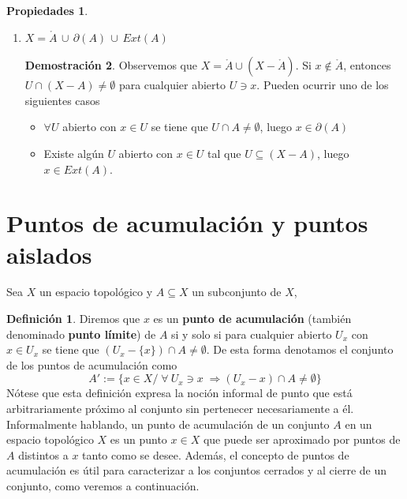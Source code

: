 \documentclass[12pt,twoside]{report}
\theoremstyle{azul}
\theoremstyle{azul2}
\theoremstyle{plain}
\theoremstyle{definition}
\newtheorem*{defi}{Definición}
\newtheorem*{propi}{Propiedades}
\newtheorem*{dem}{Demostración}
\theoremstyle{remark}
\begin{document}
\begin{propi}
\begin{enumerate}
\begin{dem}
    (Obsérvese que son si y solo sies, luego queda demostrado en ambos sentidos)
    \end{dem}
    \item $X = \mathring{A} \, \cup \, \partial(A) \, \cup \, Ext(A)$
    \begin{dem}
        Observemos que $X=\mathring{A}\cup(X-\mathring{A})$. Si $x\nin \mathring{A}$, entonces $U\cap (X-A)\neq\emptyset$ para cualquier abierto $U\ni x$. Pueden ocurrir uno de los siguientes casos  
        \begin{itemize}
        \item[1)] $\forall U$ abierto con $x\in U$ se tiene que $U\cap A\neq \emptyset$, luego $x\in \partial(A)$
        \item[2)] Existe algún $U$ abierto con $x\in U$ tal que $U\subseteq (X-A)$, luego $x\in Ext(A)$. 
\end{itemize}
\end{dem}
\end{enumerate}
\end{propi}

\section{Puntos de acumulación y puntos aislados} \label{ais}
Sea $X$ un espacio topológico y $A \subseteq X$ un subconjunto de $X$, 
\begin{defi}
Diremos que $x$  es un \textbf{punto de acumulación} (tambi{\'e}n denominado \textbf{punto límite}) de $A$ si y solo si para cualquier abierto $U_x$ con $x \in U_x$ se tiene que $(U_x- \{ x \}) \cap A \neq \emptyset$. De esta forma denotamos el conjunto de los puntos de acumulación como 
$$A':= \{x \in X / \; \forall \: U_x \ni x \; \Rightarrow (U_x - x) \cap A \neq \emptyset \}$$
\justifying Nótese que esta definición expresa la noción informal de punto que está arbitrariamente próximo al conjunto sin pertenecer necesariamente a él. Informalmente hablando, un punto de acumulación de un conjunto $A$ en un espacio topológico $X$ es un punto $x \in X$ que puede ser aproximado por puntos de $A$ distintos a $x$ tanto como se desee. Además, el concepto de puntos de acumulación es útil para caracterizar a los conjuntos cerrados y al cierre de un conjunto, como veremos a continuación.
\end{defi}
\end{document}
